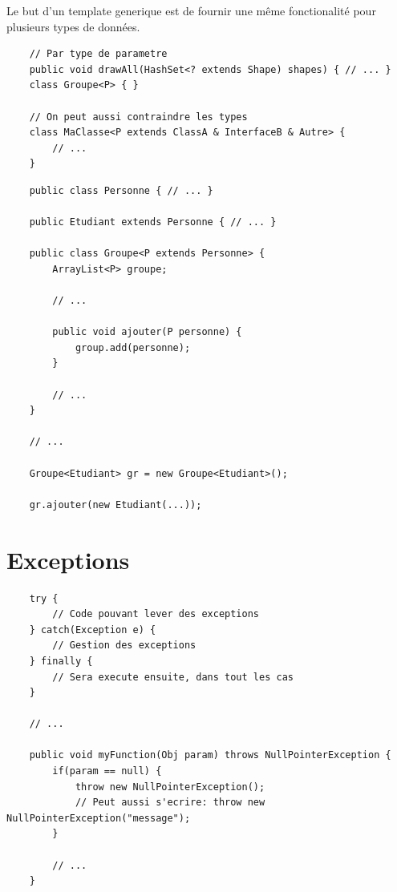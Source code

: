 \documentclass[a4paper, 12pt, french]{article}
\begin{document}
	Le but d'un template generique est de fournir une même fonctionalité pour plusieurs types de données.

	\begin{lstlisting}
	// Par type de parametre
	public void drawAll(HashSet<? extends Shape) shapes) { // ... }
	class Groupe<P> { }

	// On peut aussi contraindre les types
	class MaClasse<P extends ClassA & InterfaceB & Autre> {
		// ...
	}
	\end{lstlisting}

	\begin{lstlisting}
	public class Personne { // ... }

	public Etudiant extends Personne { // ... }

	public class Groupe<P extends Personne> {
		ArrayList<P> groupe;

		// ...

		public void ajouter(P personne) {
			group.add(personne);
		}

		// ...
	}

	// ...

	Groupe<Etudiant> gr = new Groupe<Etudiant>();

	gr.ajouter(new Etudiant(...));
	\end{lstlisting}

	\section{Exceptions}

	\begin{lstlisting}
	try {
		// Code pouvant lever des exceptions
	} catch(Exception e) {
		// Gestion des exceptions
	} finally {
		// Sera execute ensuite, dans tout les cas
	}

	// ...

	public void myFunction(Obj param) throws NullPointerException {
		if(param == null) {
			throw new NullPointerException();
			// Peut aussi s'ecrire: throw new NullPointerException("message");
		}

		// ...
	}
	\end{lstlisting}
\end{document}
